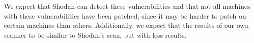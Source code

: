 We expect that Shodan can detect these vulnerabilities and that not all
machines with these vulnerabilities have been patched, since it may be
harder to patch on certain machines than others. Additionally, we expect
that the results of our own scanner to be similar to Shodan's scan, but
with less results.
